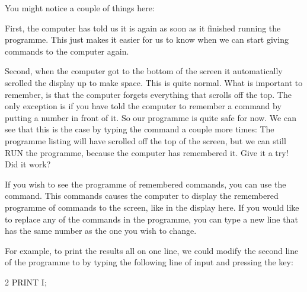   You might notice a couple of things here:

  First, the computer has told us it is  again
  as soon as it finished running the programme. This just makes it easier for us to know when we
  can start giving commands to the computer again.

  Second, when the computer got to the bottom of the screen
  it automatically scrolled the display up to make space.  This is quite normal.  What is important
  to remember, is that the computer forgets everything that scrolls off the top.  The only exception
  is if you have told the computer to remember a command by putting a number in front of it.  So
  our programme is quite safe for now. We can see that this is the case by typing the  command a
  couple more times: The programme listing will have scrolled off the top of the screen, but we can
  still RUN the programme, because the computer has remembered it.  Give it a try!
  Did it work?

\needspace{4cm} %
  If you wish to see the programme of remembered commands, you can use the 
  command.  This commands causes the computer to display the remembered programme of commands to the screen, like in the display here.
  If you would like to replace any of the commands in the programme, you can type a new line that has the same number as the one you
  wish to change.


\needspace{4cm} %
  For example, to print the results all on one line, we could modify the second line of the programme to  by
  typing the following line of input and pressing the  key:



\begin{screenoutput}
2 PRINT I;
\end{screenoutput}


\needspace{4cm} %

